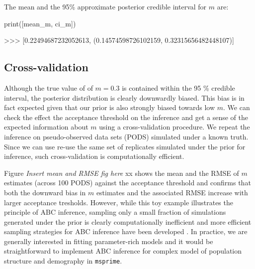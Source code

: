 \documentclass[graybox]{svmult}
\newcommand{\msprime}[0]{\texttt{msprime}}
\begin{document}
The mean and the 95\% approximate posterior credible interval for \(m\)
are:
\begin{pythoncode}
print([mean_m, ci_m])

>>> [0.22494687232052613, (0.14574598726102159, 0.32315656482448107)]
\end{pythoncode}

\subsection{Cross-validation}
\label{sec:Cross-validation}

Although the true value of of \(m=0.3\) is contained within the 95 \% credible interval, the posterior distribution is clearly downwardly biased. This bias is in fact expected given that our prior is also strongly biased towards low \(m\). We can check the effect the acceptance threshold on the inference and get a sense of the expected information about \(m\) using a cross-validation procedure. We repeat the inference on pseudo-observed data sets (PODS) simulated under a known truth. Since we can use re-use the same set of replicates simulated under the prior for inference, such cross-validation is computationally efficient. 

Figure \textit{Insert mean and RMSE fig here} xx shows the mean and the RMSE of \(m\) estimates (across 100 PODS) against the acceptance threshold and confirms that both the downward bias in \(m\) estimates and the associated RMSE increase with larger acceptance tresholds. However, while this toy example illustrates the principle of ABC inference, sampling only a small fraction of simulations generated under the prior is clearly computationally inefficient and more efficient sampling strategies for ABC inference have been developed \citep{Beaumont2002}. In practice, we are generally interested in fitting parameter-rich models and it would be straightforward to implement ABC inference for complex model of population structure and demography in \msprime.
\end{document}
